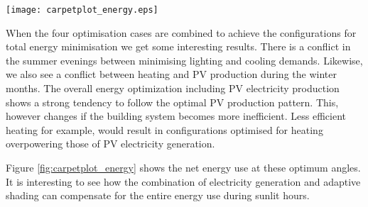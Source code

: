 \begin{figure*}
\begin{center}
\texttt{[image: carpetplot\_energy.eps]}
\caption{Carpet plots detailing the net energy consumption. Each square represents the total energy consumption for that specific hour of the entire month. Red colours detail the energy demand, while blue colours detail the energy supply.}
\label{fig:carpetplot_energy}
\end{center}
\end{figure*}



When the four optimisation cases are combined to achieve the configurations for total energy minimisation we get some interesting results. There is a conflict in the summer evenings between minimising lighting and cooling demands. Likewise, we also see a conflict between heating and PV production during the winter months. The overall energy optimization including PV electricity production shows a strong tendency to follow the optimal PV production pattern. This, however changes if the building system becomes more inefficient. Less efficient heating for example, would result in configurations optimised for heating overpowering those of PV electricity generation.


Figure \ref{fig:carpetplot_energy} shows the net energy use at these optimum angles. It is interesting to see how the combination of electricity generation and adaptive shading can compensate for the entire energy use during sunlit hours.

